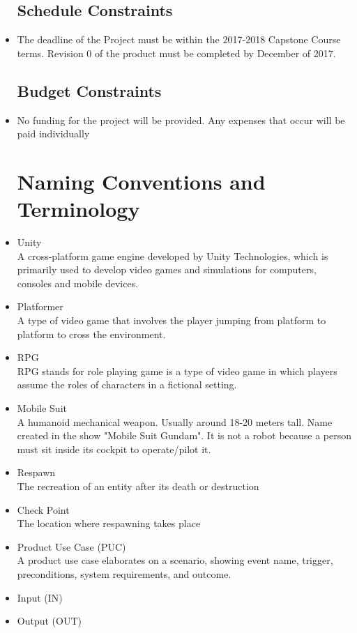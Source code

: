 \documentclass{article}
\begin{document}
\begin{itemize}

	\subsection{Schedule Constraints}
	\item The deadline of the Project must be within the 2017-2018 Capstone Course terms. Revision 0 of the product must be completed by December of 2017.

	\subsection{Budget Constraints}
	\item No funding for the project will be provided. Any expenses that occur will be paid individually

	\section{Naming Conventions and Terminology}


		\item Unity \\ A cross-platform game engine developed by Unity Technologies, which is primarily used to develop video games and simulations for computers, consoles and mobile devices.
		\item Platformer \\
		A type of video game that involves the player jumping from platform to platform to cross the environment.
		\item RPG \\
		RPG stands for role playing game is a type of video game in which players assume the roles of characters in a fictional setting.
		\item Mobile Suit \\ A humanoid mechanical weapon. Usually around 18-20 meters tall. Name created in the show "Mobile Suit Gundam". It is not a robot because a person must sit inside its cockpit to operate/pilot it.
		\item Respawn \\ The recreation of an entity after its death or destruction
		\item Check Point \\ The location where respawning takes place
		\item Product Use Case (PUC) \\ A product use case elaborates on a scenario, showing event name, trigger, preconditions, system requirements, and outcome.
		\item Input (IN)
		\item Output (OUT)
	\end{itemize}
\end{document}
